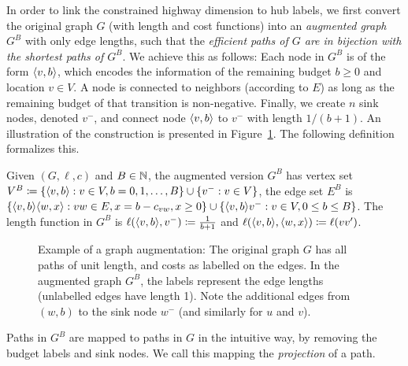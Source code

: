 In order to link the constrained highway dimension to hub labels, we first convert the original graph $G$ (with length and cost functions) into an \emph{augmented graph} $G^B$ with only edge lengths, such that the \emph{efficient paths of $G$ are in bijection with the shortest paths of $G^B$}.
We achieve this as follows: Each node in $G^B$ is of the form $\pp{v,b}$, which encodes the information of the remaining budget $b\geq 0$ and location $v\in V$.
A node is connected to neighbors (according to $E$) as long as the remaining budget of that transition is non-negative.
Finally, we create $n$ sink nodes, denoted $v^-$, and connect node $\pp{v,b}$ to $v^-$ with length $1/(b+1)$.
An illustration of the construction is presented in Figure~\ref{fig:augmented}.
The following definition formalizes this. 

\begin{definition}
Given $(G,\ell,c)$ and $B\in\N$, the augmented version $G^B$ has vertex set $V^B \defeq\crl*{\pp{v,b}: v\in V, b=0,1,\ldots,B}\cup\crl*{v^-:v\in V}$, the edge set $E^B$ is $\crl*{\pp{v,b}\pp{w,x} : vw\in E, x=b-c_{vw}, x\geq 0}\cup\crl*{\pp{v,b}v^-: v\in V, 0\leq b\leq B}$.
The length function in $G^B$ is $\ell(\pp{v,b},v^-) \defeq \frac{1}{b+1}$ and $\ell(\pp{v,b},\pp{w,x}) \defeq \ell(vv')$.
\end{definition}

\begin{figure}

\caption{Example of a graph augmentation: The original graph $G$ has all paths of unit length, and costs as labelled on the edges. In the augmented graph $G^B$, the labels represent the edge lengths (unlabelled edges have length 1). Note the additional edges from $(w,b)$ to the sink node $w^-$ (and similarly for $u$ and $v$). 
}
\label{fig:augmented}
\end{figure}

Paths in $G^B$ are mapped to paths in $G$ in the intuitive way, by removing the budget labels and sink nodes.
We call this mapping the \emph{projection} of a path.


